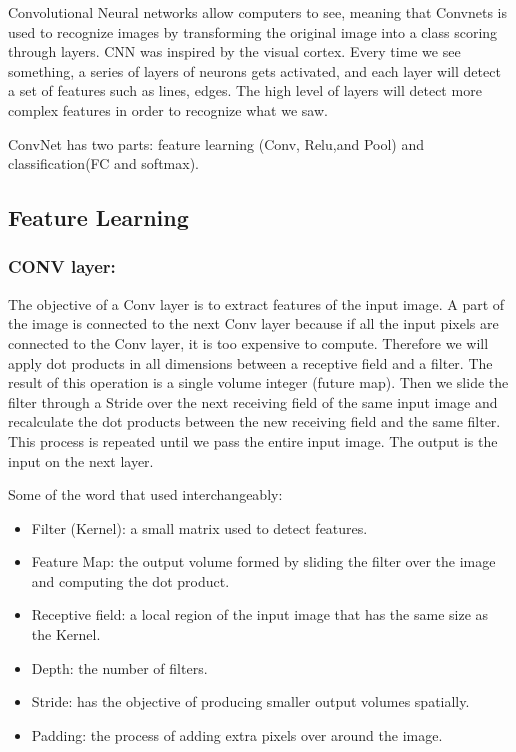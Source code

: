 \documentclass[12pt]{report}
\begin{document}
Convolutional Neural networks allow computers to see, 
meaning that Convnets is used to recognize images by 
transforming the original image into a class scoring through layers.
CNN was inspired by the visual cortex.
Every time we see something, a series of layers of neurons gets activated, 
and each layer will detect a set of features such as lines, edges. 
The high level of layers will detect more complex features in order to recognize what we saw.

ConvNet has two parts: feature learning (Conv, Relu,and Pool) and classification(FC and softmax).

\subsection{Feature Learning}
\subsubsection{CONV layer:}
The objective of a Conv layer is to extract features of the input image.
A part of the image is connected to the next Conv layer because if all the 
input pixels are connected to the Conv layer, it is too expensive to compute. 
Therefore we will apply dot products in all dimensions between a receptive 
field and a filter. The result of this operation is a single volume integer (future map).
Then we slide the filter through a Stride over the next receiving field of the same input 
image and recalculate the dot products between the new receiving field and the same filter.
This process is repeated until we pass the entire input image. The output is the input on the next layer.

Some of the word that used interchangeably:
\begin{itemize}
    \item Filter (Kernel): a small matrix used to detect features.
    \item Feature Map: the output volume formed by sliding the filter over the image and computing the dot product.
    \item Receptive field: a local region of the input image that has the same size as the Kernel.
    \item Depth: the number of filters.
    \item Stride: has the objective of producing smaller output volumes spatially.
    \item Padding: the process of adding extra pixels over around the image.
\end{itemize}
\end{document}
